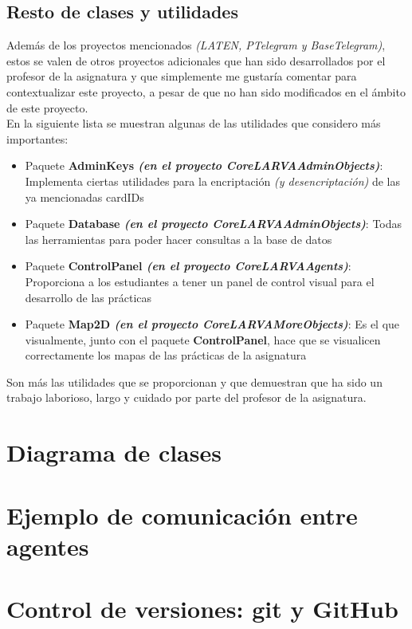 \subsection{Resto de clases y utilidades}

Además de los proyectos mencionados \textit{(LATEN, PTelegram y BaseTelegram)}, estos se valen de otros proyectos adicionales que han sido desarrollados por el profesor de la asignatura y que simplemente me gustaría comentar para contextualizar este proyecto, a pesar de que no han sido modificados en el ámbito de este proyecto.\\

En la siguiente lista se muestran algunas de las utilidades que considero más importantes:

\begin{itemize}
	\item Paquete \textbf{AdminKeys \textit{(en el proyecto CoreLARVAAdminObjects)}}: Implementa ciertas utilidades para la encriptación \textit{(y desencriptación)} de las ya mencionadas cardIDs
	\item Paquete \textbf{Database \textit{(en el proyecto CoreLARVAAdminObjects)}}: Todas las herramientas para poder hacer consultas a la base de datos
	\item Paquete \textbf{ControlPanel \textit{(en el proyecto CoreLARVAAgents)}}: Proporciona a los estudiantes a tener un panel de control visual para el desarrollo de las prácticas
	\item Paquete \textbf{Map2D \textit{(en el proyecto CoreLARVAMoreObjects)}}: Es el que visualmente, junto con el paquete \textbf{ControlPanel}, hace que se visualicen correctamente los mapas de las prácticas de la asignatura
\end{itemize}

Son más las utilidades que se proporcionan y que demuestran que ha sido un trabajo laborioso, largo y cuidado por parte del profesor de la asignatura.

\section{Diagrama de clases}

\section{Ejemplo de comunicación entre agentes}

\section{Control de versiones: git y GitHub}


